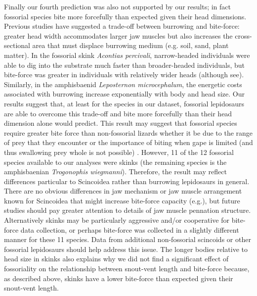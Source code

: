 \documentclass[a4paper, 12pt]{article}
\begin{document}
Finally our fourth prediction was also not supported by our results; in fact fossorial species bite more forcefully than expected given their head dimensions.
Previous studies have suggested a trade-off between burrowing and bite-force: greater head width accommodates larger jaw muscles but also increases the cross-sectional area that must displace burrowing medium (e.g. soil, sand, plant matter). 
In the fossorial skink \textit{Acontias percivali}, narrow-headed individuals were able to dig into the substrate much faster than broader-headed individuals, but bite-force was greater in individuals with relatively wider heads\cite{vanhooydonck2011push} (although see\cite{le2020trade}).
Similarly, in the amphisbaenid \textit{Leposternon microcephalum}, the energetic costs associated with burrowing increase exponentially with body and head size\cite{navas2004morphological}.
Our results suggest that, at least for the species in our dataset, fossorial lepidosaurs are able to overcome this trade-off and bite more forcefully than their head dimension alone would predict. 
This result may suggest that fossorial species require greater bite force than non-fossorial lizards whether it be due to the range of prey that they encounter or the importance of biting when gape is limited (and thus swallowing prey whole is not possible) . 
However, 11 of the 12 fossorial species available to our analyses were skinks (the remaining species is the amphisbaenian \textit{Trogonophis wiegmanni}).
Therefore, the result may reflect differences particular to Scincoidea rather than burrowing lepidosaurs in general.
There are no obvious differences in jaw mechanism or jaw muscle arrangement known for Scincoidea that might increase bite-force capacity (e.g.\cite{haas1973muscles,daza2011jaw}), but future studies should pay greater attention to details of jaw muscle pennation structure. 
Alternatively skinks may be particularly aggressive and/or cooperative for bite-force data collection, or perhaps bite-force was collected in a slightly different manner for these 11 species. 
Data from additional non-fossorial scincoids or other fossorial lepidosaurs should help address this issue.
The longer bodies relative to head size in skinks also explains why we did not find a significant effect of fossoriality on the relationship between snout-vent length and bite-force because, as described above, skinks have a lower bite-force than expected given their snout-vent length. 
\end{document}
